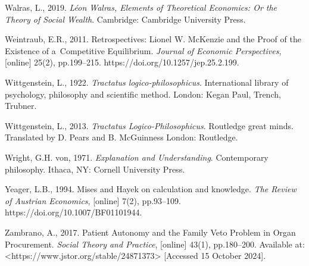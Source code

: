 Walras, L., 2019. \textit{Léon Walras, Elements of Theoretical Economics: Or the Theory of Social Wealth}. Cambridge: Cambridge University Press.



Weintraub, E.R., 2011. Retrospectives: Lionel W. McKenzie and the Proof of the Existence of a~Competitive Equilibrium. \textit{Journal of Economic Perspectives}, [online] 25(2), pp.199–215. https://doi.org/10.1257/jep.25.2.199.



Wittgenstein, L., 1922. \textit{Tractatus logico-philosophicus}. International library of psychology, philosophy and scientific method. London: Kegan Paul, Trench, Trubner.



Wittgenstein, L., 2013. \textit{Tractatus Logico-Philosophicus}. Routledge great minds. Translated by D. Pears and B. McGuinness London: Routledge.



Wright, G.H. von, 1971. \textit{Explanation and Understanding}. Contemporary philosophy. Ithaca, NY: Cornell University Press.



Yeager, L.B., 1994. Mises and Hayek on calculation and knowledge. \textit{The Review of Austrian Economics}, [online] 7(2), pp.93–109. https://doi.org/10.1007/BF01101944.



Zambrano, A., 2017. Patient Autonomy and the Family Veto Problem in Organ Procurement. \textit{Social Theory and Practice}, [online] 43(1), pp.180–200. Available at: {\textless}https://www.jstor.org/stable/24871373{\textgreater} [Accessed 15 October 2024].



